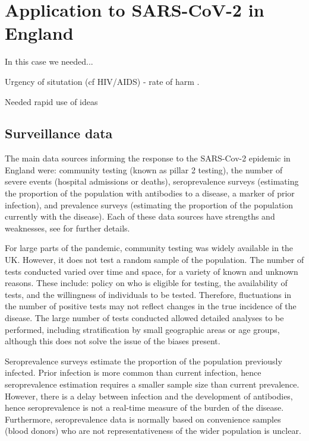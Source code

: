 \documentclass[thesis.tex]{subfiles}
\begin{document}
\section{Application to SARS-CoV-2 in England}

In this case we needed...

Urgency of situtation (cf HIV/AIDS) - rate of harm .

Needed rapid use of ideas

\subsection{Surveillance data} \label{intro:sec:data-for-estimating}

The main data sources informing the response to the SARS-Cov-2 epidemic in England were: community testing (known as pillar 2 testing), the number of severe events (\eg hospital admissions or deaths), seroprevalence surveys (estimating the proportion of the population with antibodies to a disease, a marker of prior infection), and prevalence surveys (estimating the proportion of the population currently with the disease).
Each of these data sources have strengths and weaknesses, see \textcite{royalSocietyRnumber} for further details.

For large parts of the pandemic, community testing was widely available in the UK.
However, it does not test a random sample of the population.
The number of tests conducted varied over time and space, for a variety of known and unknown reasons.
These include: policy on who is eligible for testing, the availability of tests, and the willingness of individuals to be tested.
Therefore, fluctuations in the number of positive tests may not reflect changes in the true incidence of the disease.
The large number of tests conducted allowed detailed analyses to be performed, including stratification by small geographic areas or age groups, although this does not solve the issue of the biases present.

Seroprevalence surveys estimate the proportion of the population previously infected.
Prior infection is more common than current infection, hence seroprevalence estimation requires a smaller sample size than current prevalence.
However, there is a delay between infection and the development of antibodies, hence seroprevalence is not a real-time measure of the burden of the disease.
Furthermore, seroprevalence data is normally based on convenience samples (\eg blood donors) who are not representativeness of the wider population is unclear.
\end{document}
